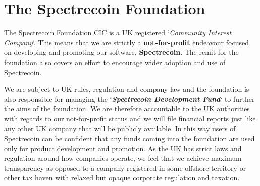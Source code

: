 \chapter{The Spectrecoin Foundation}
The Spectrecoin Foundation CIC is a UK registered ‘\textit{Community Interest Company}‘. 
This means that we are strictly a \textbf{not-for-profit} endeavour focused 
on developing and promoting our software, \textbf{Spectrecoin}. The remit 
for the foundation also covers an effort to encourage wider adoption and 
use of Spectrecoin.



We are subject to UK rules, regulation and company law and the foundation 
is also responsible for managing the ‘\textbf{\textit{Spectrecoin Development Fund}}‘ 
to further the aims of the foundation. We are therefore accountable to 
the UK authorities with regards to our not-for-profit status and we will 
file financial reports just like any other UK company that will be publicly 
available. In this way users of Spectrecoin can be confident that any funds 
coming into the foundation are used only for product development and 
promotion. As the UK has strict laws and regulation around how companies 
operate, we feel that we achieve maximum transparency as opposed to a company 
registered in some offshore territory or other tax haven with relaxed but 
opaque corporate regulation and taxation. 



